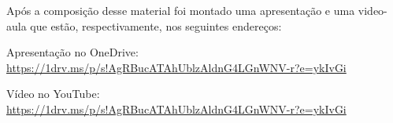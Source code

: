 Após a composição desse material foi montado uma apresentação e uma video-aula que estão, respectivamente, nos seguintes endereços:

Apresentação no OneDrive: \\
\url{https://1drv.ms/p/s!AgRBucATAhUblzAldnG4LGnWNV-r?e=ykIvGi} \\

Vídeo no YouTube: \\
\url{https://1drv.ms/p/s!AgRBucATAhUblzAldnG4LGnWNV-r?e=ykIvGi} \\
